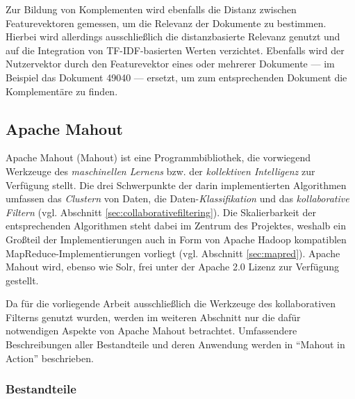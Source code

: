 

Zur Bildung von Komplementen wird ebenfalls die Distanz zwischen Featurevektoren gemessen, um die Relevanz der Dokumente zu bestimmen. Hierbei wird allerdings ausschließlich die distanzbasierte Relevanz genutzt und auf die Integration von \acs{TF-IDF}-basierten Werten verzichtet. Ebenfalls wird der Nutzervektor durch den Featurevektor eines oder mehrerer Dokumente --- im Beispiel das Dokument 49040 --- ersetzt, um zum entsprechenden Dokument die Komplementäre zu finden.



\subsection{Apache Mahout} \label{sec:mahout}

Apache Mahout (Mahout) ist eine Programmbibliothek, die vorwiegend Werkzeuge des \textit{maschinellen Lernens} bzw. der \textit{kollektiven Intelligenz} zur Verfügung stellt. Die drei Schwerpunkte der darin implementierten Algorithmen umfassen das \textit{Clustern} von Daten, die Daten-\textit{Klassifikation} und das \textit{kollaborative Filtern} (vgl. Abschnitt \ref{sec:collaborativefiltering}). Die Skalierbarkeit der entsprechenden Algorithmen steht dabei im Zentrum des Projektes, weshalb ein Großteil der Implementierungen auch in Form von Apache Hadoop kompatiblen MapReduce-Implementierungen vorliegt (vgl. Abschnitt \ref{sec:mapred}). Apache Mahout wird, ebenso wie Solr, frei unter der Apache 2.0 Lizenz zur Verfügung gestellt. \citep{mia}

Da für die vorliegende Arbeit ausschließlich die Werkzeuge des kollaborativen Filterns genutzt wurden, werden im weiteren Abschnitt nur die dafür notwendigen Aspekte von Apache Mahout betrachtet. Umfassendere Beschreibungen aller Bestandteile und deren Anwendung werden in ``Mahout in Action'' \citep{mia} beschrieben.

\subsubsection{Bestandteile} \label{sec:mahoutparts}
%


